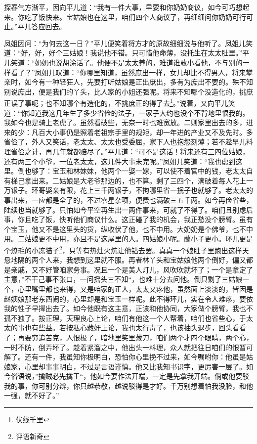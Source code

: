 \documentclass[12pt,oneside]{book}
\begin{document}
探春气方渐平，因向平儿道：“我有一件大事，早要和你奶奶商议，如今可巧想起来。你吃了饭快来。宝姑娘也在这里，咱们四个人商议了，再细细问你奶奶可行可止。”平儿答应回去。

凤姐因问：“为何去这一日？”平儿便笑着将方才的原故细细说与他听了。凤姐儿笑道：“好，好，好个三姑娘！我说他不错。只可惜他命薄，没托生在太太肚里。”平儿笑道：“奶奶也说胡涂话了。他便不是太太养的，难道谁敢小看他，不与别的一样看了？”凤姐儿叹道：“你哪里知道，虽然庶出一样，女儿却比不得男人，将来攀亲时，如今有一种轻狂人，先要打听姑娘是正出庶出，多有为庶出不要的。殊不知别说庶出，便是我们的丫头，比人家的小姐还强呢。将来不知哪个没造化的，挑庶正误了事呢；也不知哪个有造化的，不挑庶正的得了去\footnote{伏线千里}。”说着，又向平儿笑道：“你知道我这几年生了多少省俭的法子，一家子大约也没个不背地里恨我的。我如今也是骑上老虎了。虽然看破些，无奈一时也难宽放。二则家里出去的多，进来的少：凡百大小事仍是照着老祖宗手里的规矩，却一年进的产业又不及先时。多省俭了，外人又笑话，老太太、太太也受委屈，家下人也抱怨刻薄；若不趁早儿料理省俭之计，再几年就都赔尽了。”平儿道：“可不是这话！将来还有三四位姑娘，还有两三个小爷，一位老太太，这几件大事未完呢。”凤姐儿笑道：“我也虑到这里。倒也够了：宝玉和林妹妹，他两个一娶一嫁，可以使不着官中的钱，老太太自有梯己拿出来。二姑娘是大老爷那边的，也不算。剩了三四个，满破着每人花上一万银子。环哥娶亲有限，花上三千两银子，不拘哪里省一抿子也就够了。老太太的事出来，一应都是全了的，不过零星杂项，便费也满破三五千两。如今再俭省些，陆续也当就够了。只怕如今平空再生出一两件事来，可就了不得了。咱们且别虑后事，你且吃了饭，快听他们商议什么。这正碰了我的机会，我正愁没个膀臂。虽有个宝玉，他又不是这里头的货，纵收伏了他，也不中用。大奶奶是个佛爷，也不中用。二姑娘更不中用，亦且不是这屋里的人。四姑娘小呢。蘭小子更小。环儿更是个燎毛的小冻猫子\footnote{评语新奇}，只等有热灶火炕让他钻去罢。真真一个娘肚子里跑出这样天悬地隔的两个人来，我想到这里就不服。再者林丫头和宝姑娘他两个倒好，偏又都是亲戚，又不好管咱家务事。况且一个是美人灯儿，风吹吹就坏了；一个是拿定了主意，”不干己事不张口，一问摇头三不知“，也难十分去问他。倒只剩了三姑娘一个，心里嘴里都也来得，又是咱家的正人，太太又疼他，虽然面上淡淡的，皆因是赵姨娘那老东西闹的，心里却是和宝玉一样呢。此不得环儿，实在令人难疼，要依我的性子早撵出去了。如今他既有这主意，正该和他协同，大家做个膀臂，我也不孤不独了。按正理，天理良心上论，咱们有他这一个人帮着，咱们也省些心，于太太的事也有些益。若按私心藏奸上论，我也太行毒了，也该抽头退步，回头看看了；再要穷追苦克，人恨极了，暗地里笑里藏刀，咱们两个才四个眼睛，两个心，一时不防，倒弄坏了。趁着紧溜之中，他出头一料理，众人就把往日咱们的恨暂可解了。还有一件，我虽知你极明白，恐怕你心里挽不过来，如今嘱咐你：他虽是姑娘家，心里却事事明白，不过是言语谨慎。他又比我知书识字，更厉害一层了。如今俗语说，”擒贼必先擒王“，他如今要作法开端，一定是先拿我开端。倘或他要驳我的事，你可别分辨，你只越恭敬，越说驳得是才好。千万别想着怕我没脸，和他一强，就不好了。”
\end{document}

